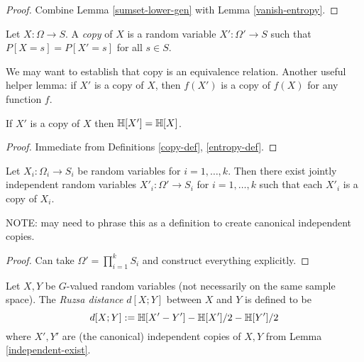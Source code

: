 \begin{proof}  Combine Lemma \ref{sumset-lower-gen} with Lemma \ref{vanish-entropy}.
\end{proof}

\begin{definition}[Copy]\label{copy-def}
  \leanok
  Let $X : \Omega \to S$.  A \emph{copy} of $X$ is a random variable $X' : \Omega' \to S$ such that $P[X=s] = P[X'=s]$ for all $s \in S$.
\end{definition}

We may want to establish that copy is an equivalence relation. Another useful helper lemma: if $X'$ is a copy of $X$, then $f(X')$ is a copy of $f(X)$ for any function $f$.

\begin{lemma}\label{copy-ent}
  \leanok
  If $X'$ is a copy of $X$ then $\mathbb{H}[X'] = \mathbb{H}[X]$.
\end{lemma}

\begin{proof} Immediate from Definitions \ref{copy-def}, \ref{entropy-def}.
\end{proof}

\begin{lemma}\label{independent-exist}
  Let $X_i : \Omega_i \to S_i$ be random variables for $i=1,\dots,k$.  Then there exist jointly independent random variables $X'_i: \Omega' \to S_i$ for $i=1,\dots,k$ such that each $X'_i$ is a copy of $X_i$.
\end{lemma}

NOTE: may need to phrase this as a definition to create canonical independent copies.

\begin{proof} Can take $\Omega' = \prod_{i=1}^k S_i$ and construct everything explicitly.
\end{proof}

\begin{definition}\label{ruz-dist-def}
  \leanok
  Let $X,Y$ be $G$-valued random variables (not necessarily on the same sample space).  The \emph{Ruzsa distance} $d[X;Y]$ between $X$ and $Y$ is defined to be
$$ d[X;Y] := \mathbb{H}[X' - Y'] - \mathbb{H}[X']/2 - \mathbb{H}[Y']/2$$
where $X',Y'$ are (the canonical) independent copies of $X,Y$ from Lemma \ref{independent-exist}.
\end{definition}

